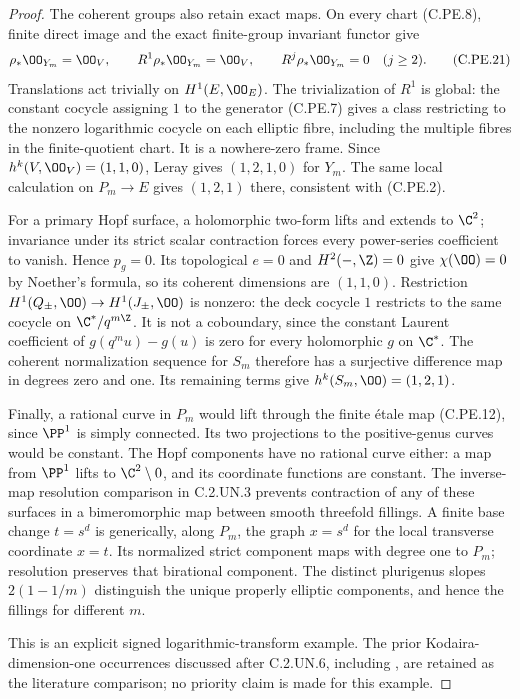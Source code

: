\begin{proof}
The coherent groups also retain exact maps.
On every chart (C.PE.8), finite direct image and
the exact finite-group invariant functor give
\[
 \rho_*\OO_{Y_m}=\OO_V,\qquad
 R^1\rho_*\OO_{Y_m}=\OO_V,\qquad
 R^j\rho_*\OO_{Y_m}=0\quad(j\ge2).                       \tag{C.PE.21}
\]
Translations act trivially on $H^1(E,\OO_E)$.
The trivialization of $R^1$ is global: the
constant cocycle assigning $1$ to the generator
(C.PE.7) gives a class restricting to the
nonzero logarithmic cocycle on each elliptic
fibre, including the multiple fibres in the
finite-quotient chart. It is a nowhere-zero
frame. Since $h^k(V,\OO_V)=(1,1,0)$, Leray gives
$(1,2,1,0)$ for $Y_m$. The same local calculation
on $P_m\to E$ gives $(1,2,1)$ there, consistent
with (C.PE.2).

For a primary Hopf surface, a holomorphic
two-form lifts and extends to $\C^2$; invariance
under its strict scalar contraction forces
every power-series coefficient to vanish.
Hence $p_g=0$. Its topological $e=0$ and
$H^2(-,\Z)=0$ give $\chi(\OO)=0$ by Noether's
formula, so its coherent dimensions are
$(1,1,0)$. Restriction
$H^1(Q_\pm,\OO)\to H^1(J_\pm,\OO)$ is nonzero:
the deck cocycle $1$ restricts to the same
cocycle on $\C^*/q^{m\Z}$. It is not a
coboundary, since the constant Laurent
coefficient of $g(q^m u)-g(u)$ is zero for
every holomorphic $g$ on $\C^*$.
The coherent normalization sequence for
$S_m$ therefore has a surjective difference
map in degrees zero and one. Its remaining
terms give $h^k(S_m,\OO)=(1,2,1)$.

Finally, a rational curve in $P_m$ would lift
through the finite \'etale map (C.PE.12), since
$\PP^1$ is simply connected. Its two projections
to the positive-genus curves would be constant.
The Hopf components have no rational curve
either: a map from $\PP^1$ lifts to
$\C^2\setminus0$, and its coordinate functions
are constant. The inverse-map resolution
comparison in C.2.UN.3 prevents contraction
of any of these surfaces in a bimeromorphic
map between smooth threefold fillings. A
finite base change $t=s^d$ is generically,
along $P_m$, the graph $x=s^d$ for the local
transverse coordinate $x=t$. Its normalized
strict component maps with degree one to
$P_m$; resolution preserves that birational
component. The distinct plurigenus slopes
$2(1-1/m)$ distinguish the unique properly
elliptic components, and hence the fillings
for different $m$.

This is an explicit signed logarithmic-transform
example. The prior Kodaira-dimension-one
occurrences discussed after C.2.UN.6, including
\cite[Example~3.4(1)]{Fujimoto1988Log}, are retained
as the literature comparison; no priority claim
is made for this example.
\end{proof}
